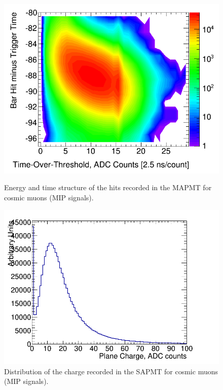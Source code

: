 \documentclass[a4paper,11pt]{article}
\begin{document}
\begin{figure}
 \centering
 \begin{minipage}[b]{.49\textwidth}
  \centering
  \includegraphics[width=.9\textwidth]{tot_vs_deltat_log_scale_2D.png}
  \caption{Energy and time structure of the hits recorded in the MAPMT for cosmic muons (MIP signals).}
  \label{fig:tot_vs_deltat}
 \end{minipage}
 \hfill
 \begin{minipage}[b]{.49\textwidth}
  \centering
  \includegraphics[width=\textwidth]{plane_charge_hist.png}
  \vspace{1mm}
  \caption{Distribution of the charge recorded in the SAPMT for cosmic muons (MIP signals).}
  \label{fig:plane_charge}
 \end{minipage}
\end{figure} 
\end{document}
